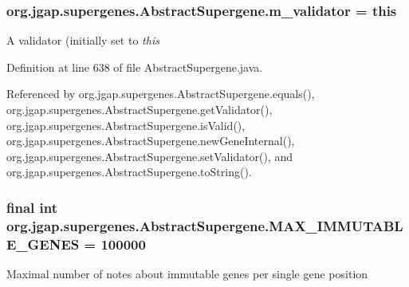 \hypertarget{classorg_1_1jgap_1_1supergenes_1_1_abstract_supergene_a8792c7c19ad0cdb48ade652a110a9016}{
\subsubsection[{m\-\_\-validator}]{ org.\-jgap.\-supergenes.\-Abstract\-Supergene.\-m\-\_\-validator = this\hspace{0.3cm}{\ttfamily [protected]}}}\label{classorg_1_1jgap_1_1supergenes_1_1_abstract_supergene_a8792c7c19ad0cdb48ade652a110a9016}
A validator (initially set to {\itshape this} 

Definition at line 638 of file Abstract\-Supergene.\-java.



Referenced by org.\-jgap.\-supergenes.\-Abstract\-Supergene.\-equals(), org.\-jgap.\-supergenes.\-Abstract\-Supergene.\-get\-Validator(), org.\-jgap.\-supergenes.\-Abstract\-Supergene.\-is\-Valid(), org.\-jgap.\-supergenes.\-Abstract\-Supergene.\-new\-Gene\-Internal(), org.\-jgap.\-supergenes.\-Abstract\-Supergene.\-set\-Validator(), and org.\-jgap.\-supergenes.\-Abstract\-Supergene.\-to\-String().

\hypertarget{classorg_1_1jgap_1_1supergenes_1_1_abstract_supergene_a40054ab751c7676fcd9f974c029a6a9d}{
\subsubsection[{M\-A\-X\-\_\-\-I\-M\-M\-U\-T\-A\-B\-L\-E\-\_\-\-G\-E\-N\-E\-S}]{\setlength{\rightskip}{0pt plus 5cm}final int org.\-jgap.\-supergenes.\-Abstract\-Supergene.\-M\-A\-X\-\_\-\-I\-M\-M\-U\-T\-A\-B\-L\-E\-\_\-\-G\-E\-N\-E\-S = 100000\hspace{0.3cm}{\ttfamily [static]}}}\label{classorg_1_1jgap_1_1supergenes_1_1_abstract_supergene_a40054ab751c7676fcd9f974c029a6a9d}
Maximal number of notes about immutable genes per single gene position 

